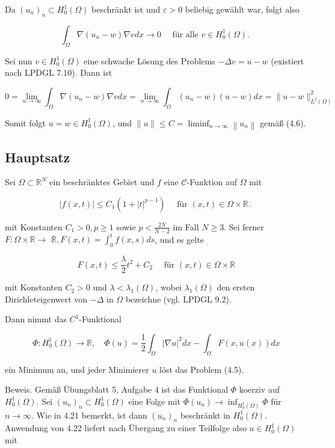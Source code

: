 \documentclass[10pt, letterpaper]{article}
\begin{document}
Da $\left(u_{n}\right)_{n} \subset H_{0}^{1}(\Omega)$ beschränkt ist und $\varepsilon>0$ beliebig gewählt war, folgt also

$$
\int_{\Omega} \nabla\left(u_{n}-w\right) \nabla v d x \rightarrow 0 \quad \text { für alle } v \in H_{0}^{1}(\Omega) \text {. }
$$

Sei nun $v \in H_{0}^{1}(\Omega)$ eine schwache Lösung des Problems $-\Delta v=u-w$ (existiert nach LPDGL 7.10). Dann ist

$$
0=\lim _{n \rightarrow \infty} \int_{\Omega} \nabla\left(u_{n}-w\right) \nabla v d x=\lim _{n \rightarrow \infty} \int_{\Omega}\left(u_{n}-w\right)(u-w) d x=\|u-w\|_{L^{2}(\Omega)}^{2}
$$

Somit folgt $u=w \in H_{0}^{1}(\Omega)$, und $\|u\| \leq C=\liminf _{n \rightarrow \infty}\left\|u_{n}\right\|$ gemäß (4.6).

\subsection*{Hauptsatz}

Sei $\Omega \subset \mathbb{R}^{N}$ ein beschränktes Gebiet und $f$ eine $\mathcal{C}$-Funktion auf $\Omega$ mit

$$
|f(x, t)| \leq C_{1}\left(1+|t|^{p-1}\right) \quad \text { für }(x, t) \in \Omega \times \mathbb{R} \text {. }
$$

mit Konstanten $C_{1}>0, p \geq 1$ sowie $p<\frac{2 N}{N-2}$ im Fall $N \geq 3$. Sei ferner $F: \Omega \times \mathbb{R} \rightarrow$ $\mathbb{R}, F(x, t)=\int_{0}^{t} f(x, s) d s$, und es gelte

$$
F(x, t) \leq \frac{\lambda}{2} t^{2}+C_{2} \quad \text { für }(x, t) \in \Omega \times \mathbb{R}
$$

mit Konstanten $C_{2}>0$ und $\lambda<\lambda_{1}(\Omega)$, wobei $\lambda_{1}(\Omega)$ den ersten Dirichleteigenwert von $-\Delta$ in $\Omega$ bezeichne (vgl. LPDGL 9.2).

Dann nimmt das $C^{1}$-Funktional

$$
\Phi: H_{0}^{1}(\Omega) \rightarrow \mathbb{R}, \quad \Phi(u)=\frac{1}{2} \int_{\Omega}|\nabla u|^{2} d x-\int_{\Omega} F(x, u(x)) d x
$$

ein Minimum an, und jeder Minimierer $u$ löst das Problem (4.5).

Beweis. Gemäß Übungsblatt 5, Aufgabe 4 ist das Funktional $\Phi$ koerziv auf $H_{0}^{1}(\Omega)$. Sei $\left(u_{n}\right)_{n} \subset H_{0}^{1}(\Omega)$ eine Folge mit $\Phi\left(u_{n}\right) \rightarrow \inf _{H_{0}^{1}(\Omega)} \Phi$ für $n \rightarrow \infty$. Wie in 4.21 bemerkt, ist dann $\left(u_{n}\right)_{n}$ beschränkt in $H_{0}^{1}(\Omega)$. Anwendung von 4.22 liefert nach Übergang zu einer Teilfolge also $u \in H_{0}^{1}(\Omega)$ mit
\end{document}
